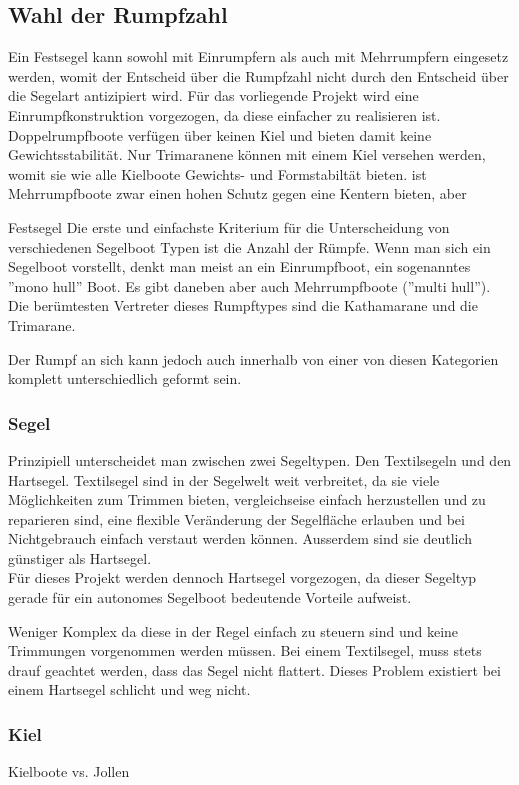 \subsection{Wahl der Rumpfzahl}
Ein Festsegel kann sowohl mit Einrumpfern als auch mit Mehrrumpfern eingesetz werden, womit der Entscheid über die Rumpfzahl nicht durch den Entscheid über die Segelart antizipiert wird.  
Für das vorliegende Projekt wird eine Einrumpfkonstruktion vorgezogen, da diese einfacher zu realisieren ist. Doppelrumpfboote verfügen über keinen Kiel und bieten damit keine Gewichtsstabilität. Nur Trimaranene können mit einem Kiel versehen werden, womit sie wie alle Kielboote Gewichts- und Formstabiltät bieten.  ist  Mehrrumpfboote zwar einen hohen Schutz gegen eine Kentern bieten, aber 

Festsegel Die erste und einfachste Kriterium für die Unterscheidung von verschiedenen Segelboot Typen ist die Anzahl der  Rümpfe. Wenn man sich ein Segelboot vorstellt, denkt man meist an ein Einrumpfboot, ein sogenanntes ”mono hull” Boot. Es gibt daneben aber auch Mehrrumpfboote (”multi hull”). Die berümtesten Vertreter dieses Rumpftypes sind die Kathamarane und die Trimarane.

Der Rumpf an sich kann jedoch auch innerhalb von einer von diesen Kategorien komplett unterschiedlich geformt sein.

\subsubsection{Segel}
Prinzipiell unterscheidet man zwischen zwei Segeltypen. Den Textilsegeln und den Hartsegel.
Textilsegel sind in der Segelwelt weit verbreitet, da sie viele Möglichkeiten zum Trimmen bieten,  vergleichseise einfach herzustellen und zu reparieren sind, eine flexible Veränderung der Segelfläche erlauben und bei Nichtgebrauch einfach verstaut werden können. Ausserdem sind sie deutlich günstiger als Hartsegel. 
\\
Für dieses Projekt werden dennoch Hartsegel vorgezogen, da dieser Segeltyp gerade für ein autonomes Segelboot bedeutende Vorteile aufweist. 


Weniger Komplex
da diese in der Regel einfach zu steuern sind und keine Trimmungen vorgenommen werden müssen. 
Bei einem Textilsegel, muss stets drauf geachtet werden, dass das Segel nicht flattert. Dieses Problem existiert bei einem Hartsegel schlicht und weg nicht.

\subsubsection{Kiel}
Kielboote vs. Jollen

